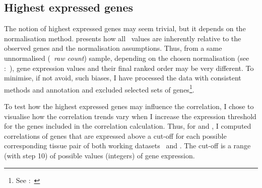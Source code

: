 \subsection{Highest expressed genes}

The notion of highest expressed genes may seem trivial,
but it depends on the normalisation method.
 presents how all \Rnaseq\ values are inherently relative
to the observed genes and the normalisation assumptions.
Thus, from a same unnormalised (\ie\ \emph{raw count}) sample,
depending on the chosen normalisation
(see :~),
gene expression values and their final ranked order may be very different.
To minimise, if not avoid, such biases,
I have processed the data with consistent methods and annotation
and excluded selected sets of
genes\footnote{See :~}.

To test how the highest expressed genes may influence the correlation,
I chose to visualise how the correlation trends vary
when I increase the expression threshold for the genes included
in the correlation calculation.
Thus, for  and ,
I computed correlations of genes that are expressed above a cut-off
for each possible corresponding tissue pair of both working datasets \setOne\ and \setTwo.
The cut-off is a range (with step 10) of possible values (integers) of gene expression.

